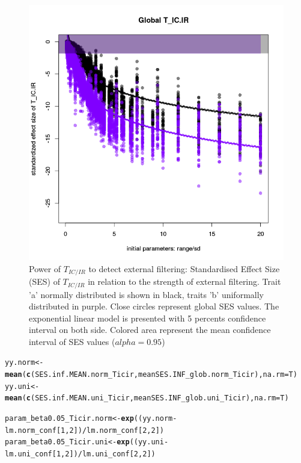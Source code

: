 \documentclass[12pt]{article}\usepackage[]{graphicx}\usepackage[]{color}
\makeatletter
\def\maxwidth{ %
  \ifdim\Gin@nat@width>\linewidth
    \linewidth
  \else
    \Gin@nat@width
  \fi
}
\newcommand{\hlnum}[1]{\textcolor[rgb]{0.686,0.059,0.569}{#1}}%
\newcommand{\hlopt}[1]{\textcolor[rgb]{0,0,0}{#1}}%
\newcommand{\hlstd}[1]{\textcolor[rgb]{0.345,0.345,0.345}{#1}}%
\newcommand{\hlkwb}[1]{\textcolor[rgb]{0.69,0.353,0.396}{#1}}%
\newcommand{\hlkwc}[1]{\textcolor[rgb]{0.333,0.667,0.333}{#1}}%
\newcommand{\hlkwd}[1]{\textcolor[rgb]{0.737,0.353,0.396}{\textbf{#1}}}%
\newenvironment{kframe}{%
 \def\at@end@of@kframe{}%
 \ifinner\ifhmode%
  \def\at@end@of@kframe{\end{minipage}}%
  \begin{minipage}{\columnwidth}%
 \fi\fi%
 \def\FrameCommand##1{\hskip\@totalleftmargin \hskip-\fboxsep
 \colorbox{shadecolor}{##1}\hskip-\fboxsep
     \hskip-\linewidth \hskip-\@totalleftmargin \hskip\columnwidth}%
 \MakeFramed {\advance\hsize-\width
   \@totalleftmargin\z@ \linewidth\hsize
   \@setminipage}}%
 {\par\unskip\endMakeFramed%
 \at@end@of@kframe}
\newenvironment{knitrout}{}{} %
\makeatother
\begin{document}
\begin{knitrout}
\begin{figure}
{\centering \includegraphics[width=\maxwidth]{figure/Ex_conc_plot1-1} 

}

\caption[Power of $T_{IC/IR}$ to detect external filtering]{Power of $T_{IC/IR}$ to detect external filtering: Standardised Effect Size (SES) of $T_{IC/IR}$ in relation to the strength of external filtering. Trait 'a' normally distributed is shown in black, traits 'b' uniformally distributed in purple. Close circles represent global SES values. The exponential linear model is presented with 5 percents confidence interval on both side. Colored area represent the mean confidence interval of SES values ($alpha = 0.95$)}\label{fig:Ex_conc_plot1}
\end{figure}


\end{knitrout}

\begin{knitrout}\small
{}\color{fgcolor}\begin{kframe}
\begin{alltt}
\hlstd{yy.norm} \hlkwb{<-} \hlkwd{mean}\hlstd{(}\hlkwd{c}\hlstd{(SES.inf.MEAN.norm_Ticir, meanSES.INF_glob.norm_Ticir),} \hlkwc{na.rm} \hlstd{= T)}
\hlstd{yy.uni} \hlkwb{<-} \hlkwd{mean}\hlstd{(}\hlkwd{c}\hlstd{(SES.inf.MEAN.uni_Ticir, meanSES.INF_glob.uni_Ticir),} \hlkwc{na.rm} \hlstd{= T)}

\hlstd{param_beta0.05_Ticir.norm} \hlkwb{<-} \hlkwd{exp}\hlstd{( (yy.norm} \hlopt{-} \hlstd{lm.norm_conf [}\hlnum{1}\hlstd{,} \hlnum{2}\hlstd{])} \hlopt{/} \hlstd{lm.norm_conf [}\hlnum{2}\hlstd{,} \hlnum{2}\hlstd{] )}
\hlstd{param_beta0.05_Ticir.uni} \hlkwb{<-} \hlkwd{exp}\hlstd{( (yy.uni} \hlopt{-} \hlstd{lm.uni_conf [}\hlnum{1}\hlstd{,} \hlnum{2}\hlstd{])} \hlopt{/} \hlstd{lm.uni_conf [}\hlnum{2}\hlstd{,} \hlnum{2}\hlstd{] )}
\end{alltt}
\end{kframe}
\end{knitrout}
\end{document}
